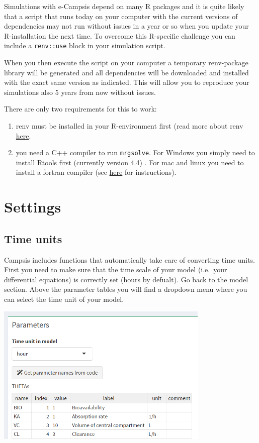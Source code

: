 \documentclass[
]{book}
\begin{document}
Simulations with e-Campsis depend on many R packages and it is quite likely that a script that runs today on your computer with the current versions of dependencies may not run without issues in a year or so when you update your R-installation the next time. To overcome this R-specific challenge you can include a \texttt{renv::use} block in your simulation script.

When you then execute the script on your computer a temporary renv-package library will be generated and all dependencies will be downloaded and installed with the exact same version as indicated. This will allow you to reproduce your simulations also 5 years from now without issues.

There are only two requirements for this to work:

\begin{enumerate}
\def\labelenumi{\arabic{enumi})}
\item
  renv must be installed in your R-environment first (read more about renv \href{https://rstudio.github.io/renv/articles/renv.html}{here}.
\item
  you need a C++ compiler to run \texttt{mrgsolve}. For Windows you simply need to install \href{https://cran.r-project.org/bin/windows/Rtools/rtools44/rtools.html}{Rtools} first (currently version 4.4) . For mac and linux you need to install a fortran compiler (see \href{https://github.com/metrumresearchgroup/mrgsolve/wiki/mrgsolve-Installation\#compilers-buid-tools}{here} for instructions).
\end{enumerate}

\chapter{Settings}\label{settings}

\section{Time units}\label{time-units}

Campsis includes functions that automatically take care of converting time units. First you need to make sure that the time scale of your model (i.e.~your differential equations) is correctly set (hours by defualt). Go back to the model section. Above the parameter tables you will find a dropdown menu where you can select the time unit of your model.

\includegraphics[width=4.01042in,height=\textheight]{pictures/model_time.png}
\end{document}
